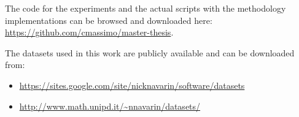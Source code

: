 The code for the experiments and the actual scripts with the methodology implementations
can be browsed and downloaded here: \url{https://github.com/cmassimo/master-thesis}.

The datasets used in this work are publicly available and can be downloaded from:
\begin{itemize}
    \item \url{https://sites.google.com/site/nicknavarin/software/datasets}
    \item \url{http://www.math.unipd.it/~nnavarin/datasets/}
\end{itemize}
